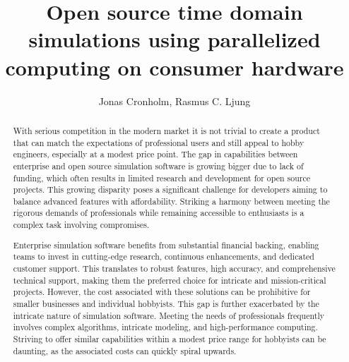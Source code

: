 \documentclass[11pt, a4paper, titlepage]{article}
\begin{document}
	\begin{titlepage}
		\title{Open source time domain simulations using parallelized computing on consumer hardware\let\thefootnote\relax{}}
		\author{Jonas Cronholm, Rasmus C. Ljung}
		\maketitle
	\end{titlepage}



\begin{abstract}
	
	
	With serious competition in the modern market it is not trivial to create a product that can match the expectations of professional users and still appeal to hobby engineers, especially at a modest price point. The gap in capabilities between enterprise and open source simulation software is growing bigger due to lack of funding, which often results in limited research and development for open source projects. This growing disparity poses a significant challenge for developers aiming to balance advanced features with affordability. Striking a harmony between meeting the rigorous demands of professionals while remaining accessible to enthusiasts is a complex task involving compromises.
	
	Enterprise simulation software benefits from substantial financial backing, enabling teams to invest in cutting-edge research, continuous enhancements, and dedicated customer support. This translates to robust features, high accuracy, and comprehensive technical support, making them the preferred choice for intricate and mission-critical projects. However, the cost associated with these solutions can be prohibitive for smaller businesses and individual hobbyists. This gap is further exacerbated by the intricate nature of simulation software. Meeting the needs of professionals frequently involves complex algorithms, intricate modeling, and high-performance computing. Striving to offer similar capabilities within a modest price range for hobbyists can be daunting, as the associated costs can quickly spiral upwards.
	

\end{abstract}
\end{document}

